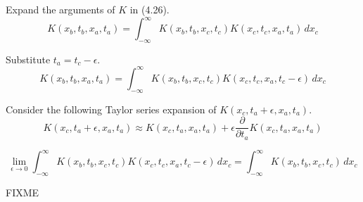 


Expand the arguments of $K$ in (4.26).
\begin{equation*}
K(x_b,t_b,x_a,t_a)=\int_{-\infty}^\infty K(x_b,t_b,x_c,t_c)K(x_c,t_c,x_a,t_a)\,dx_c
\end{equation*}

Substitute $t_a=t_c-\epsilon$.
\begin{equation*}
K(x_b,t_b,x_a,t_a)=\int_{-\infty}^\infty K(x_b,t_b,x_c,t_c)K(x_c,t_c,x_a,t_c-\epsilon)\,dx_c
\end{equation*}

Consider the following Taylor series expansion of $K(x_c,t_a+\epsilon,x_a,t_a)$.
\begin{equation*}
K(x_c,t_a+\epsilon,x_a,t_a)\approx K(x_c,t_a,x_a,t_a)+\epsilon\frac{\partial}{\partial t_a}K(x_c,t_a,x_a,t_a)
\end{equation*}

\begin{equation*}
\lim_{\epsilon\rightarrow0}\int_{-\infty}^\infty K(x_b,t_b,x_c,t_c)K(x_c,t_c,x_a,t_c-\epsilon)\,dx_c
=\int_{-\infty}^\infty K(x_b,t_b,x_c,t_c)\,dx_c
\end{equation*}

FIXME



